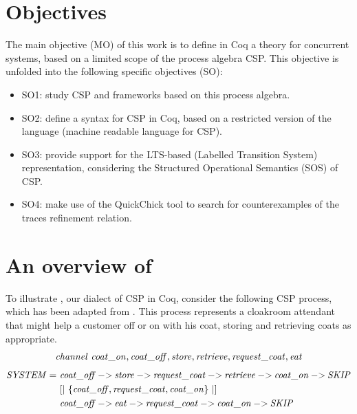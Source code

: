 \section{Objectives}

The main objective (MO) of this work is to define in Coq a theory for concurrent systems, based on a limited scope of the process algebra CSP. This objective is unfolded into the following specific objectives (SO):

\begin{itemize}
	\item SO1: study CSP and frameworks based on this process algebra.
	\item SO2: define a syntax for CSP in Coq, based on a restricted version of the \CSPM{} language (machine readable language for CSP).
	\item SO3: provide support for the LTS-based (Labelled Transition System) representation, considering the Structured Operational Semantics (SOS) of CSP.
	\item SO4: make use of the QuickChick \cite{pierce:quickchick} tool to search for counterexamples of the traces refinement relation.
\end{itemize}

\section{An overview of \CSPcoq{}}

To illustrate \CSPcoq{}, our dialect of CSP in Coq, consider the following CSP process, which has been adapted from . This process represents a cloakroom attendant that might help a customer off or on with his coat, storing and retrieving coats as appropriate.
%
\begin{align}
	\mathit{channel\ coat\_on, coat\_off, store, retrieve, request\_coat, eat}\notag
\end{align}
\begin{align}
	\mathit{SYSTEM} =\ &\mathit{coat\_off \mathbin{{-}{>}} store \mathbin{{-}{>}} request\_coat \mathbin{{-}{>}} retrieve \mathbin{{-}{>}} coat\_on \mathbin{{-}{>}} SKIP}\notag\\
			 &[|\ \{\mathit{coat\_off, request\_coat, coat\_on}\}\ |]\notag\\
	  		 &\mathit{coat\_off \mathbin{{-}{>}} eat \mathbin{{-}{>}} request\_coat \mathbin{{-}{>}} coat\_on \mathbin{{-}{>}} SKIP}\notag
\end{align}

